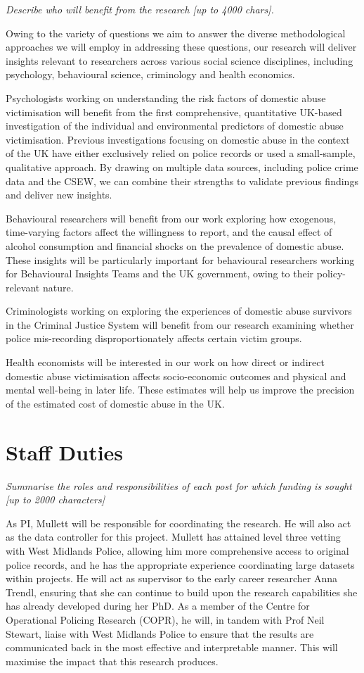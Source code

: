 \documentclass[11pt, a4paper]{article}
\begin{document}
\textit{Describe who will benefit from the research [up to 4000 chars].}

Owing to the variety of questions we aim to answer the diverse methodological approaches we will employ in addressing these questions, our research will deliver insights relevant to researchers across various social science disciplines, including psychology, behavioural science, criminology and health economics.

Psychologists working on understanding the risk factors of domestic abuse victimisation will benefit from the first comprehensive, quantitative UK-based investigation of the individual and environmental predictors of domestic abuse victimisation. Previous investigations focusing on domestic abuse in the context of the UK have either exclusively relied on police records or used a small-sample, qualitative approach. By drawing on multiple data sources, including police crime data and the CSEW, we can combine their strengths to validate previous findings and deliver new insights.

Behavioural researchers will benefit from our work exploring how exogenous, time-varying factors affect the willingness to report, and the causal effect of alcohol consumption and financial shocks on the prevalence of domestic abuse. These insights will be particularly important for behavioural researchers working for Behavioural Insights Teams and the UK government, owing to their policy-relevant nature.

Criminologists working on exploring the experiences of domestic abuse survivors in the Criminal Justice System will benefit from our research examining whether police mis-recording disproportionately affects certain victim groups. 


Health economists will be interested in our work on how direct or indirect domestic abuse victimisation affects socio-economic outcomes and physical and mental well-being in later life. These estimates will help us improve the precision of the estimated cost of domestic abuse in the UK.


\section{Staff Duties}

\textit{Summarise the roles and responsibilities of each post for which funding is sought [up to 2000 characters]}

As PI, Mullett will be responsible for coordinating the research. He will also act as the data controller for this project. Mullett has attained level three vetting with West Midlands Police, allowing him more comprehensive access to original police records, and he has the appropriate experience coordinating large datasets within projects. He will act as supervisor to the early career researcher Anna Trendl, ensuring that she can continue to build upon the research capabilities she has already developed during her PhD. As a member of the Centre for Operational Policing Research (COPR), he will, in tandem with Prof Neil Stewart, liaise with West Midlands Police to ensure that the results are communicated back in the most effective and interpretable manner. This will maximise the impact that this research produces.
\end{document}
